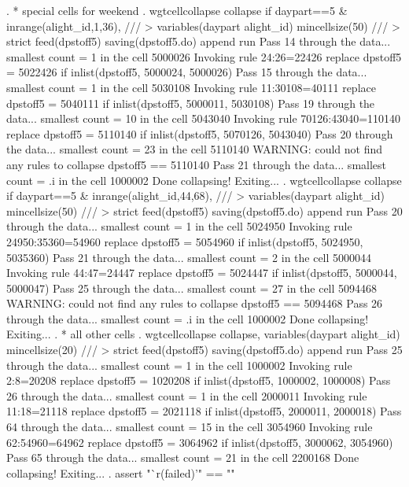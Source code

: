 . * special cells for weekend
. wgtcellcollapse collapse if daypart==5 \& inrange(alight_id,1,36), ///
>         variables(daypart alight_id) mincellsize(50) ///
>         strict feed(dpstoff5) saving(dpstoff5.do) append run
Pass 14 through the data...
  smallest count = 1 in the cell      5000026
  Invoking rule 24:26=22426
  replace dpstoff5 = 5022426 if inlist(dpstoff5, 5000024, 5000026)
Pass 15 through the data...
  smallest count = 1 in the cell      5030108
  Invoking rule 11:30108=40111
  replace dpstoff5 = 5040111 if inlist(dpstoff5, 5000011, 5030108)
\smallskip
\oom
\smallskip
Pass 19 through the data...
  smallest count = 10 in the cell      5043040
  Invoking rule 70126:43040=110140
  replace dpstoff5 = 5110140 if inlist(dpstoff5, 5070126, 5043040)
Pass 20 through the data...
  smallest count = 23 in the cell      5110140
  WARNING: could not find any rules to collapse dpstoff5 == 5110140
Pass 21 through the data...
  smallest count = .i in the cell      1000002
  Done collapsing! Exiting...
{\smallskip}
. wgtcellcollapse collapse if daypart==5 \& inrange(alight_id,44,68), ///
>         variables(daypart alight_id) mincellsize(50) ///
>         strict feed(dpstoff5) saving(dpstoff5.do) append run
Pass 20 through the data...
  smallest count = 1 in the cell      5024950
  Invoking rule 24950:35360=54960
  replace dpstoff5 = 5054960 if inlist(dpstoff5, 5024950, 5035360)
Pass 21 through the data...
  smallest count = 2 in the cell      5000044
  Invoking rule 44:47=24447
  replace dpstoff5 = 5024447 if inlist(dpstoff5, 5000044, 5000047)
\smallskip
\oom
\smallskip
Pass 25 through the data...
  smallest count = 27 in the cell      5094468
  WARNING: could not find any rules to collapse dpstoff5 == 5094468
Pass 26 through the data...
  smallest count = .i in the cell      1000002
  Done collapsing! Exiting...
{\smallskip}
. * all other cells
. wgtcellcollapse collapse, variables(daypart alight_id) mincellsize(20) ///
>         strict feed(dpstoff5) saving(dpstoff5.do) append run
Pass 25 through the data...
  smallest count = 1 in the cell      1000002
  Invoking rule 2:8=20208
  replace dpstoff5 = 1020208 if inlist(dpstoff5, 1000002, 1000008)
Pass 26 through the data...
  smallest count = 1 in the cell      2000011
  Invoking rule 11:18=21118
  replace dpstoff5 = 2021118 if inlist(dpstoff5, 2000011, 2000018)
\smallskip
\oom
\smallskip
Pass 64 through the data...
  smallest count = 15 in the cell      3054960
  Invoking rule 62:54960=64962
  replace dpstoff5 = 3064962 if inlist(dpstoff5, 3000062, 3054960)
Pass 65 through the data...
  smallest count = 21 in the cell      2200168
  Done collapsing! Exiting...
{\smallskip}
. assert "`r(failed)'" == ""
{\smallskip}
